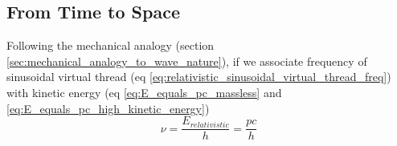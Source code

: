 \documentclass[11pt, a4paper]{article}
\begin{document}
\begin{enumerate}
\end{enumerate}

\subsection{From Time to Space}
Following the mechanical analogy (section \ref{sec:mechanical_analogy_to_wave_nature}), if we associate frequency of sinusoidal virtual thread (eq \ref{eq:relativistic_sinusoidal_virtual_thread_freq}) with kinetic energy (eq \eqref{eq:E_equals_pc_massless} and \eqref{eq:E_equals_pc_high_kinetic_energy})
\begin{equation*}
	\nu = \frac{E_{relativistic}}{h} = \frac{pc}{h}
\end{equation*}
\end{document}
